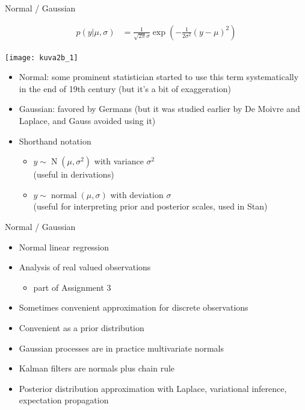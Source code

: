\documentclass[finnish,english,t]{beamer}
\DeclareMathOperator{\N}{N}
\DeclareMathOperator{\normal}{normal}
\begin{document}
\begin{frame}{Normal / Gaussian}

    \vspace{-2\baselineskip}
    \begin{align*}
    p({y}|\mu,\sigma)&=\frac{1}{\sqrt{2\pi}\sigma}\exp\left(-\frac{1}{2\sigma^2}({y}-\mu)^2\right)
    \end{align*}
    \vspace{-\baselineskip}
  \begin{center}
      \texttt{[image: kuva2b\_1]}
  \end{center}
    \vspace{-\baselineskip}
  \begin{itemize}
  \item<1-> Normal: {\color{gray} some prominent statistician started
      to use this term systematically in the end of 19th century (but
      it's a bit of exaggeration)}
  \item<2-> Gaussian: {\color{gray}favored by Germans (but it was
      studied earlier by De Moivre and Laplace, and Gauss avoided
      using it)}
  \item<3-> Shorthand notation\\
    \begin{itemize}
    \item ${y} \sim \N(\mu,\sigma^2)$ with variance $\sigma^2$\\
      (useful in derivations)
    \item ${y} \sim \normal(\mu,\sigma)$ with deviation $\sigma$\\
      (useful for interpreting prior and posterior scales, used in
      Stan)
    \end{itemize}
  \end{itemize}
  
\end{frame}

\begin{frame}{Normal / Gaussian}

  \begin{itemize}
  \item<+-> Normal linear regression%
  \item<+-> Analysis of real valued observations
    \begin{itemize}
    \item part of Assignment 3
    \end{itemize}
  \item<+-> Sometimes convenient approximation for discrete observations
  \item<+-> Convenient as a prior distribution
  \item<+-> Gaussian processes are in practice multivariate normals
  \item<+-> Kalman filters are normals plus chain rule
  \item<+-> Posterior distribution approximation with Laplace, variational
    inference, expectation propagation
  \end{itemize}
  
\end{frame}
\end{document}
